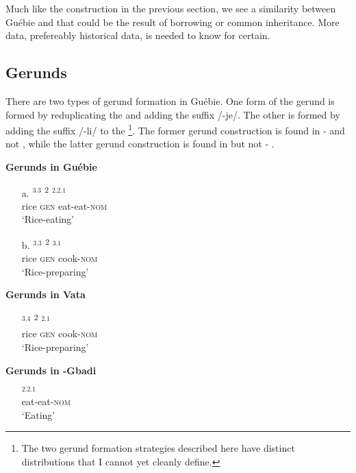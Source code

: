 \documentclass[output=paper,modfonts]{langscibook}
\begin{document}
Much like the  construction in the previous section, we see a similarity between Guébie and  that could be the result of borrowing or common inheritance. More data, prefereably historical data, is needed to know for certain.

\subsection{Gerunds}
There are two types of gerund formation in Guébie. One form of the gerund is formed by reduplicating the  and adding the suffix /-je/. The other is formed by adding the suffix /-li/ to the \footnote{The two gerund formation strategies described here have distinct distributions that I cannot yet cleanly define.}. The former gerund construction is found in - and not , while the latter gerund construction is found in  but not - \citep{Koopman1984}.

\begin{exe}
\ex \textbf{Gerunds in Guébie}\label{15}
\begin{itemize}
\item[a.] \gll {}$^{3.3}$ \textsuperscript{2} \textbf{$^{2.2.1}$}\\
rice \textsc{gen} eat-eat-\textsc{nom}\\
\trans `Rice-eating'
\item[b.] \gll {}$^{3.3}$ \textsuperscript{2} \textbf{$^{3.1}$}\\
rice \textsc{gen} cook-\textsc{nom}\\
\trans `Rice-preparing'
\end{itemize}

\ex \textbf{Gerunds in Vata}\label{16}
\begin{itemize}
\item[ ] \gll {}$^{3.4}$ \textsuperscript{2} \textbf{$^{2.1}$}\\
rice \textsc{gen} cook-\textsc{nom}\\
\trans `Rice-preparing'
\end{itemize}
\ex \textbf{Gerunds in -Gbadi}\label{17}
\begin{samepage}
\begin{itemize}
\item[ ] \gll \textbf{$^{2.2.1}$}\\
eat-eat-\textsc{nom}\\
\trans `Eating'
\end{itemize}
\end{samepage}
\end{exe}
\end{document}
